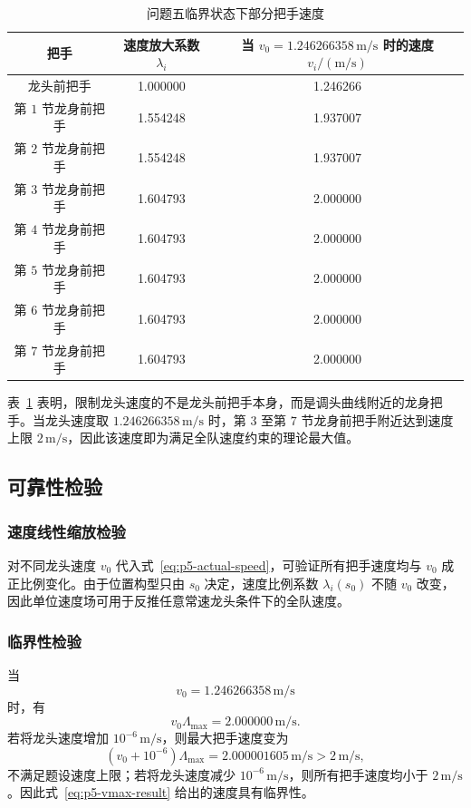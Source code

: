 \begin{table}[H]
    \centering
    \caption{问题五临界状态下部分把手速度}
    \label{tab:p5-critical-speed}
    \begin{tabular}{c c c}
        \toprule
        把手 & 速度放大系数 $\lambda_i$ & 当 $v_0=1.246266358\,\mathrm{m/s}$ 时的速度 $v_i/(\mathrm{m/s})$ \\
        \midrule
        龙头前把手 & 1.000000 & 1.246266 \\
        第 $1$ 节龙身前把手 & 1.554248 & 1.937007 \\
        第 $2$ 节龙身前把手 & 1.554248 & 1.937007 \\
        第 $3$ 节龙身前把手 & 1.604793 & 2.000000 \\
        第 $4$ 节龙身前把手 & 1.604793 & 2.000000 \\
        第 $5$ 节龙身前把手 & 1.604793 & 2.000000 \\
        第 $6$ 节龙身前把手 & 1.604793 & 2.000000 \\
        第 $7$ 节龙身前把手 & 1.604793 & 2.000000 \\
        \bottomrule
    \end{tabular}
\end{table}

表~\ref{tab:p5-critical-speed} 表明，限制龙头速度的不是龙头前把手本身，而是调头曲线附近的龙身把手。当龙头速度取 $1.246266358\,\mathrm{m/s}$ 时，第 $3$ 至第 $7$ 节龙身前把手附近达到速度上限 $2\,\mathrm{m/s}$，因此该速度即为满足全队速度约束的理论最大值。

\subsection{可靠性检验}

\subsubsection{速度线性缩放检验}

对不同龙头速度 $v_0$ 代入式~\eqref{eq:p5-actual-speed}，可验证所有把手速度均与 $v_0$ 成正比例变化。由于位置构型只由 $s_0$ 决定，速度比例系数 $\lambda_i(s_0)$ 不随 $v_0$ 改变，因此单位速度场可用于反推任意常速龙头条件下的全队速度。

\subsubsection{临界性检验}

当
\[
    v_0=1.246266358\,\mathrm{m/s}
\]
时，有
\[
    v_0\Lambda_{\max}=2.000000\,\mathrm{m/s}.
\]
若将龙头速度增加 $10^{-6}\,\mathrm{m/s}$，则最大把手速度变为
\[
    (v_0+10^{-6})\Lambda_{\max}=2.000001605\,\mathrm{m/s}>2\,\mathrm{m/s},
\]
不满足题设速度上限；若将龙头速度减少 $10^{-6}\,\mathrm{m/s}$，则所有把手速度均小于 $2\,\mathrm{m/s}$。因此式~\eqref{eq:p5-vmax-result} 给出的速度具有临界性。

